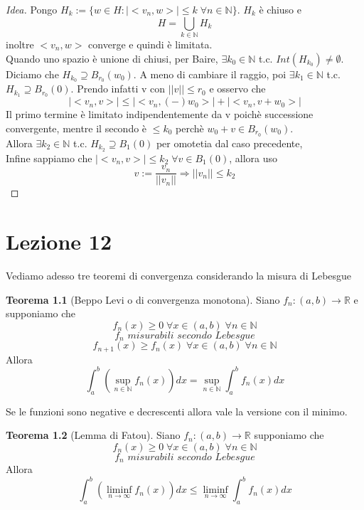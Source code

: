\documentclass[a4paper]{book}
\theoremstyle{definition}
\theoremstyle{remark}
\theoremstyle{definition}
\newtheorem{teo}{Teorema}
\newcommand{\bbr}{\mathbb{R}}
\newcommand{\ra}{\Rightarrow}
\begin{document}
\begin{proof}[Idea]
	Pongo $H_k := \{w \in H : |<v_n, w>| \le k \; \forall n \in \mathbb{N}\}$. $H_k$ è chiuso e $$H = \bigcup_{k \in \mathbb{N}} H_k$$ inoltre $<v_n, w>$ converge e quindi è limitata.
	\\
	Quando uno spazio è unione di chiusi, per Baire, $\exists k_0 \in \mathbb{N}$ t.c. $Int(H_{k_0}) \not= \emptyset$. Diciamo che $H_{k_0} \supseteq B_{r_0}(w_0)$. A meno di cambiare il raggio, poi $\exists k_1 \in \mathbb{N}$ t.c. $H_{k_1} \supseteq B_{r_0}(0)$. Prendo infatti v con $||v|| \le r_0$ e osservo che 
	$$|<v_n, v>| \le |<v_n, (-)w_0>| + |<v_n, v + w_0>|$$
	Il primo termine è limitato indipendentemente da v poichè successione convergente, mentre il secondo è $\le k_0$ perchè $w_0 + v \in B_{r_0}(w_0)$. 
	\\
	Allora $\exists k_2 \in \mathbb{N}$ t.c. $H_{k_2}\supseteq B_1(0)$ per omotetia dal caso precedente,
	\\
	Infine sappiamo che $|<v_n, v>| \le k_2 \; \forall v \in B_1(0)$, allora uso $$v := \frac{v_n}{||v_n||} \ra ||v_n|| \le k_2$$ 
\end{proof}

\chapter{Lezione 12}

Vediamo adesso tre teoremi di convergenza considerando la misura di Lebesgue

\begin{teo}[Beppo Levi o di convergenza monotona]
	Siano $f_n: (a,b) \to \bbr$ e supponiamo che
	$$f_n(x)\ge 0 \; \forall x \in (a,b)\; \forall n \in \mathbb{N}$$
	$$f_n \textit{ misurabili secondo Lebesgue}$$
	$$f_{n+1}(x)\ge f_n(x) \; \forall x \in (a,b) \; \forall n \in \mathbb{N}$$
	Allora 
	$$\int_{a}^{b} \left ( \sup_{n\in \mathbb{N}} f_n(x)\right)dx = \sup_{n\in \mathbb{N}}\int_{a}^{b}f_n(x)dx$$
\end{teo}

Se le funzioni sono negative e decrescenti allora vale la versione con il minimo.

\begin{teo}[Lemma di Fatou]
	Siano $f_n: (a,b)\to \bbr$ supponiamo che 
	$$f_n(x)\ge 0 \; \forall x \in (a,b)\; \forall n \in \mathbb{N}$$
	$$f_n \textit{ misurabili secondo Lebesgue}$$
	Allora 
	$$\int_{a}^{b} \left( \liminf_{n \to \infty} f_n(x) \right) dx \le \liminf_{n \to \infty} \int_{a}^{b}f_n(x)dx$$
\end{teo}
\end{document}
